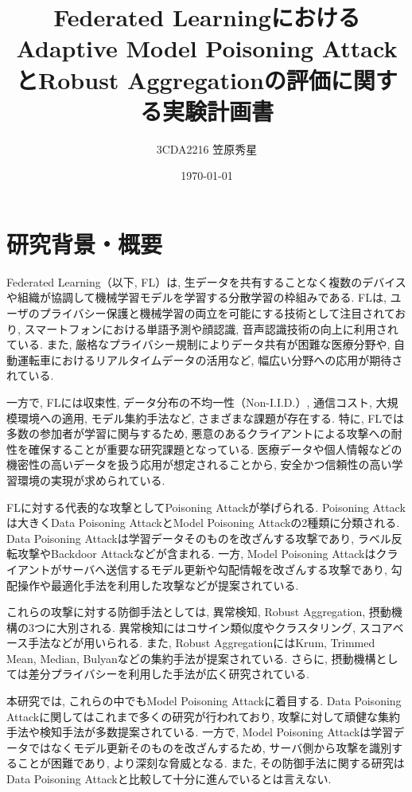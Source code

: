 \documentclass[a4j, twocolumn, dvipdfmx]{jsarticle}  %
\title{
Federated LearningにおけるAdaptive Model Poisoning AttackとRobust Aggregationの評価に関する実験計画書
}
\author{3CDA2216 笠原秀星}
\date{\today}
\begin{document}
\maketitle  %

\section{研究背景・概要}

Federated Learning（以下, FL）は, 生データを共有することなく複数のデバイスや組織が協調して機械学習モデルを学習する分散学習の枠組みである\cite{mammen2021fl}.
FLは, ユーザのプライバシー保護と機械学習の両立を可能にする技術として注目されており, スマートフォンにおける単語予測や顔認識, 音声認識技術の向上に利用されている. また, 厳格なプライバシー規制によりデータ共有が困難な医療分野や, 自動運転車におけるリアルタイムデータの活用など, 幅広い分野への応用が期待されている\cite{li2019fl}.

一方で, FLには収束性, データ分布の不均一性（Non-I.I.D.）, 通信コスト, 大規模環境への適用, モデル集約手法など, さまざまな課題が存在する\cite{ma2020privacy}. 特に, FLでは多数の参加者が学習に関与するため, 悪意のあるクライアントによる攻撃への耐性を確保することが重要な研究課題となっている. 医療データや個人情報などの機密性の高いデータを扱う応用が想定されることから, 安全かつ信頼性の高い学習環境の実現が求められている.

FLに対する代表的な攻撃としてPoisoning Attackが挙げられる. Poisoning Attackは大きくData Poisoning AttackとModel Poisoning Attackの2種類に分類される. Data Poisoning Attackは学習データそのものを改ざんする攻撃であり, ラベル反転攻撃やBackdoor Attackなどが含まれる. 一方, Model Poisoning Attackはクライアントがサーバへ送信するモデル更新や勾配情報を改ざんする攻撃であり, 勾配操作や最適化手法を利用した攻撃などが提案されている.

これらの攻撃に対する防御手法としては, 異常検知, Robust Aggregation, 摂動機構の3つに大別される. 異常検知にはコサイン類似度やクラスタリング, スコアベース手法などが用いられる. また, Robust AggregationにはKrum, Trimmed Mean, Median, Bulyanなどの集約手法が提案されている. さらに, 摂動機構としては差分プライバシーを利用した手法が広く研究されている\cite{sagar2023survey}.

本研究では, これらの中でもModel Poisoning Attackに着目する. Data Poisoning Attackに関してはこれまで多くの研究が行われており, 攻撃に対して頑健な集約手法や検知手法が多数提案されている. 一方で, Model Poisoning Attackは学習データではなくモデル更新そのものを改ざんするため, サーバ側から攻撃を識別することが困難であり, より深刻な脅威となる. また, その防御手法に関する研究はData Poisoning Attackと比較して十分に進んでいるとは言えない.
\end{document}
